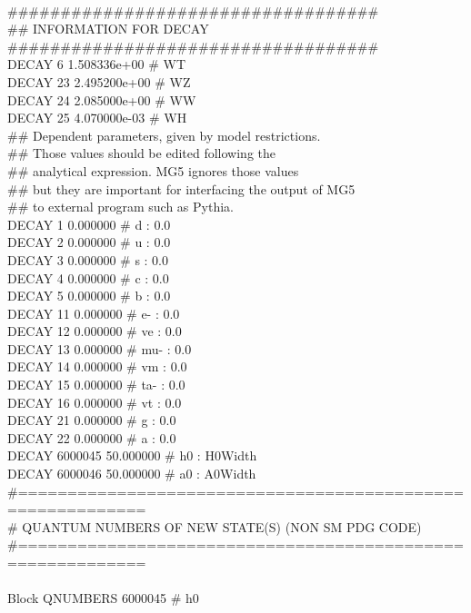 {\\
\#\#\#\#\#\#\#\#\#\#\#\#\#\#\#\#\#\#\#\#\#\#\#\#\#\#\#\#\#\#\#\#\#\#\#\\
\#\# INFORMATION FOR DECAY\\
\#\#\#\#\#\#\#\#\#\#\#\#\#\#\#\#\#\#\#\#\#\#\#\#\#\#\#\#\#\#\#\#\#\#\#\\
DECAY   6 1.508336e+00 \# WT \\
DECAY  23 2.495200e+00 \# WZ \\
DECAY  24 2.085000e+00 \# WW \\
DECAY  25 4.070000e-03 \# WH \\
\#\# Dependent parameters, given by model restrictions.\\
\#\# Those values should be edited following the \\
\#\# analytical expression. MG5 ignores those values\\ 
\#\# but they are important for interfacing the output of MG5\\
\#\# to external program such as Pythia.\\
DECAY  1 0.000000 \# d : 0.0 \\
DECAY  2 0.000000 \# u : 0.0 \\
DECAY  3 0.000000 \# s : 0.0 \\
DECAY  4 0.000000 \# c : 0.0 \\
DECAY  5 0.000000 \# b : 0.0 \\
DECAY  11 0.000000 \# e- : 0.0 \\
DECAY  12 0.000000 \# ve : 0.0 \\
DECAY  13 0.000000 \# mu- : 0.0 \\
DECAY  14 0.000000 \# vm : 0.0 \\
DECAY  15 0.000000 \# ta- : 0.0 \\
DECAY  16 0.000000 \# vt : 0.0 \\
DECAY  21 0.000000 \# g : 0.0 \\
DECAY  22 0.000000 \# a : 0.0 \\
DECAY  6000045 50.000000 \# h0 : H0Width \\
DECAY  6000046 50.000000 \# a0 : A0Width \\
\#===========================================================\\
\# QUANTUM NUMBERS OF NEW STATE(S) (NON SM PDG CODE)\\
\#===========================================================\\
\\
Block QNUMBERS 6000045  \# h0 \\
}
